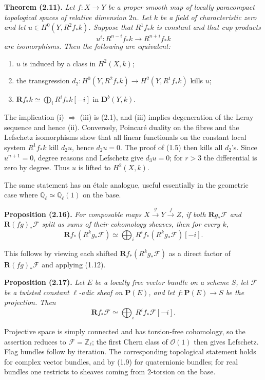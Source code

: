 \documentclass[11pt]{article}
\newcommand{\bD}{\mathbf D}
\newcommand{\cF}{\mathcal F}
\newcommand{\cO}{\mathcal O}
\newcommand{\bR}{\mathbf R}
\newcommand{\Ql}{\mathbb Q_\ell}
\newcommand{\Zl}{\mathbb Z_\ell}
\newenvironment{named}[1]{\par\medskip\noindent\textbf{#1}\itshape}{\par\medskip}
\begin{document}
\begin{named}{Theorem (2.11).}
Let $f:X\to Y$ be a proper smooth map of locally paracompact topological spaces of relative dimension $2n$. Let $k$ be a field of characteristic zero and let $u\in H^0(Y,R^2f_*k)$. Suppose that $R^1f_*k$ is constant and that cup products
\[
u^i:R^{n-i}f_*k\longrightarrow R^{n+i}f_*k
\]
are isomorphisms. Then the following are equivalent:
\begin{enumerate}[label=(\roman*)]
\item $u$ is induced by a class in $H^2(X,k)$;
\item the transgression $d_2:H^0(Y,R^2f_*k)\to H^2(Y,R^1f_*k)$ kills $u$;
\item $\bR f_*k\simeq\bigoplus_iR^if_*k[-i]$ in $\bD^b(Y,k)$.
\end{enumerate}
\end{named}
The implication (i) $\Rightarrow$ (iii) is (2.1), and (iii) implies degeneration of the Leray sequence and hence (ii). Conversely, Poincaré duality on the fibres and the Lefschetz isomorphisms show that all linear functionals on the constant local system $R^1f_*k$ kill $d_2u$, hence $d_2u=0$. The proof of (1.5) then kills all $d_2$'s. Since $u^{n+1}=0$, degree reasons and Lefschetz give $d_3u=0$; for $r>3$ the differential is zero by degree. Thus $u$ is lifted to $H^2(X,k)$.

The same statement has an étale analogue, useful essentially in the geometric case where $\Ql\simeq\Ql(1)$ on the base.

\begin{named}{Proposition (2.16).}
For composable maps $X\xrightarrow{g}Y\xrightarrow{f}Z$, if both $\bR g_*\cF$ and $\bR(fg)_*\cF$ split as sums of their cohomology sheaves, then for every $k$,
\[
\bR f_*(R^kg_*\cF)\simeq\bigoplus_iR^if_*(R^kg_*\cF)[-i].
\]
\end{named}
This follows by viewing each shifted $\bR f_*(R^kg_*\cF)$ as a direct factor of $\bR(fg)_*\cF$ and applying (1.12).

\begin{named}{Proposition (2.17).}
Let $E$ be a locally free vector bundle on a scheme $S$, let $\cF$ be a twisted constant $\ell$-adic sheaf on $\mathbf P(E)$, and let $f:\mathbf P(E)\to S$ be the projection. Then
\[
\bR f_*\cF\simeq\bigoplus_iR^if_*\cF[-i].
\]
\end{named}
Projective space is simply connected and has torsion-free cohomology, so the assertion reduces to $\cF=\Zl$; the first Chern class of $\cO(1)$ then gives Lefschetz. Flag bundles follow by iteration. The corresponding topological statement holds for complex vector bundles, and by (1.9) for quaternionic bundles; for real bundles one restricts to sheaves coming from $2$-torsion on the base.
\end{document}
